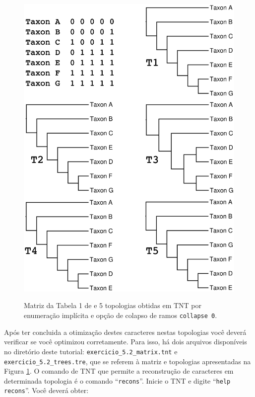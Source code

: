 \begin{refsection}
  \begin{figure}[H]
       \centering
      {\includegraphics[scale=0.75]{figures/tut5/coddington_and_scharff_col0_trees.eps}}
	{\caption[\textcite{Coddington_and_Scharff_1994} exemplo]{Matriz da Tabela 1 de \textcite{Coddington_and_Scharff_1994} e 5 topologias obtidas em TNT por enumeração implícita e opção de colapso de ramos \texttt{collapse 0}.}\label{tut5:fig:optimization}} 
  \end{figure}


Após ter concluida a otimização destes caracteres nestas topologias você deverá verificar se você optimizou corretamente. Para isso, há dois arquivos disponíveis no diretório deste tutorial: \texttt{exercicio\_5.2\_matrix.tnt} e \texttt{exercicio\_5.2\_trees.tre}, que se referem à matriz e topologias apresentadas na Figura \ref{tut5:fig:optimization}. O comando de TNT que permite a reconstrução de caracteres em determinada topologia é o comando ``\texttt{recons}''. Inicie o TNT e digite ``\texttt{help recons}''. Você deverá obter:


\end{refsection}
